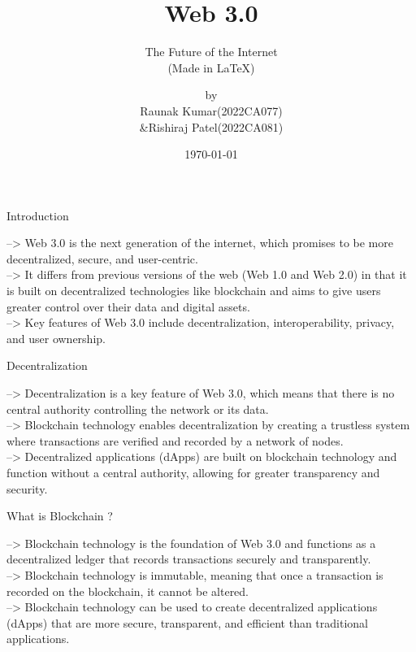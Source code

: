 \documentclass{beamer}
\title{Web 3.0}
\subtitle{The Future of the Internet\\(Made in LaTeX)}
\author{ by \\ \break\hspace{3mm}Raunak Kumar(2022CA077) \\ \&\hspace{1mm}Rishiraj Patel(2022CA081)\\}
\institute{\fontfamily{lmdh}\selectfont Motilal Nehru National Institute of Technology, Prayagraj}
\date{\today}
\begin{document}
\frame{\titlepage}

\begin{frame}{Introduction}
\begin{block}{}
--> \hspace{3mm}Web 3.0 is the next generation of the internet, which promises to be more decentralized, secure, and user-centric.
\break\\
--> \hspace{3mm} It differs from previous versions of the web (Web 1.0 and Web 2.0) in that it is built on decentralized technologies like blockchain and aims to give users greater control over their data and digital assets.
\break\\
--> \hspace{3mm} Key features of Web 3.0 include decentralization, interoperability, privacy, and user ownership.

\end{block}
\end{frame}

\begin{frame}{Decentralization}
\begin{block}{}
--> \hspace{3mm}Decentralization is a key feature of Web 3.0, which means that there is no central authority controlling the network or its data.\break\\
--> \hspace{3mm}Blockchain technology enables decentralization by creating a trustless system where transactions are verified and recorded by a network of nodes.\break\\
--> \hspace{3mm}Decentralized applications (dApps) are built on blockchain technology and function without a central authority, allowing for greater transparency and security.
\end{block}
\end{frame}

\begin{frame}{What is Blockchain ?}
\begin{block}{}
--> \hspace{3mm}Blockchain technology is the foundation of Web 3.0 and functions as a decentralized ledger that records transactions securely and transparently.\break\\
--> \hspace{3mm}Blockchain technology is immutable, meaning that once a transaction is recorded on the blockchain, it cannot be altered.\break\\
--> \hspace{3mm}Blockchain technology can be used to create decentralized applications (dApps) that are more secure, transparent, and efficient than traditional applications.
\end{block}
\end{frame}
\end{document}
